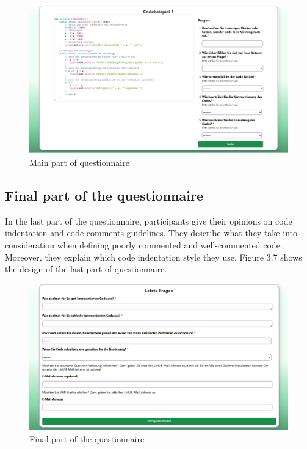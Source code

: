 \begin{figure} [H]
  \centering
  \includegraphics[scale=0.45]{figures/main_p.png}
  \caption{Main part of questionnaire}
  \label{fig:AnhangsChor}
\end{figure}



\subsection{Final part of the questionnaire}
In the last part of the questionnaire, participants give their opinions on code indentation and code comments guidelines. They describe what they take into consideration when defining poorly commented and well-commented code. Moreover, they explain which code indentation style they use.  Figure 3.7 shows the design of the last part of questionnaire.


\begin{figure}  [H]
  \centering
  \includegraphics[scale=0.45]{figures/last_part.png}
  \caption{Final part of the questionnaire}
  \label{fig:AnhangsChor}
\end{figure}


